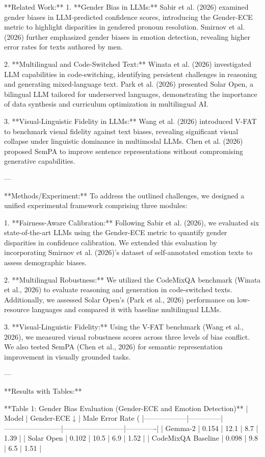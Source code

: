 **Related Work:**  
1. **Gender Bias in LLMs:**  
    Sabir et al. (2026) examined gender biases in LLM-predicted confidence scores, introducing the Gender-ECE metric to highlight disparities in gendered pronoun resolution. Smirnov et al. (2026) further emphasized gender biases in emotion detection, revealing higher error rates for texts authored by men.  

2. **Multilingual and Code-Switched Text:**  
   Winata et al. (2026) investigated LLM capabilities in code-switching, identifying persistent challenges in reasoning and generating mixed-language text. Park et al. (2026) presented Solar Open, a bilingual LLM tailored for underserved languages, demonstrating the importance of data synthesis and curriculum optimization in multilingual AI.  

3. **Visual-Linguistic Fidelity in LLMs:**  
   Wang et al. (2026) introduced V-FAT to benchmark visual fidelity against text biases, revealing significant visual collapse under linguistic dominance in multimodal LLMs. Chen et al. (2026) proposed SemPA to improve sentence representations without compromising generative capabilities.  

---

**Methods/Experiment:**  
To address the outlined challenges, we designed a unified experimental framework comprising three modules:  

1. **Fairness-Aware Calibration:**  
   Following Sabir et al. (2026), we evaluated six state-of-the-art LLMs using the Gender-ECE metric to quantify gender disparities in confidence calibration. We extended this evaluation by incorporating Smirnov et al. (2026)'s dataset of self-annotated emotion texts to assess demographic biases.  

2. **Multilingual Robustness:**  
   We utilized the CodeMixQA benchmark (Winata et al., 2026) to evaluate reasoning and generation in code-switched texts. Additionally, we assessed Solar Open's (Park et al., 2026) performance on low-resource languages and compared it with baseline multilingual LLMs.  

3. **Visual-Linguistic Fidelity:**  
   Using the V-FAT benchmark (Wang et al., 2026), we measured visual robustness scores across three levels of bias conflict. We also tested SemPA (Chen et al., 2026) for semantic representation improvement in visually grounded tasks.  

---

**Results with Tables:**  

**Table 1: Gender Bias Evaluation (Gender-ECE and Emotion Detection)**  
| Model           | Gender-ECE ↓ | Male Error Rate (%
|------------------|--------------|------------------------|--------------------------|-------------|  
| Gemma-2         | 0.154        | 12.1                  | 8.7                      | 1.39        |  
| Solar Open      | 0.102        | 10.5                  | 6.9                      | 1.52        |  
| CodeMixQA Baseline | 0.098     | 9.8                   | 6.5                      | 1.51        |  

